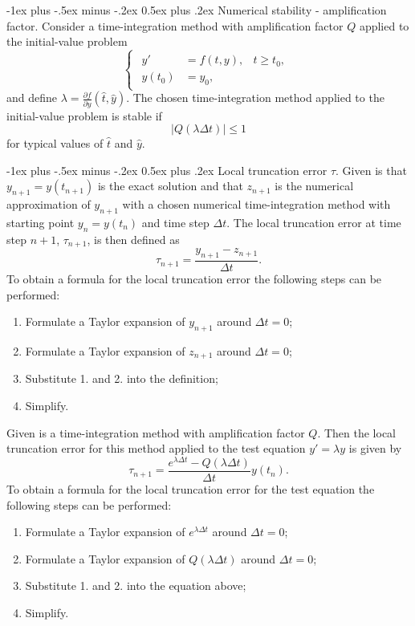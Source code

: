 \documentclass[10pt,landscape,a4paper]{article}
\makeatletter
\renewcommand{\section}{\@startsection{section}{1}{0mm}%
	{-1ex plus -.5ex minus -.2ex}%
	{0.5ex plus .2ex}%
	{\normalfont\large\bfseries}}
\makeatother
\begin{document}
\begin{multicols}{3}
	\section{Numerical stability - amplification factor.}
	Consider a time-integration method with amplification factor $ Q $ applied to the initial-value problem
	\[
		\begin{cases}
			\begin{aligned}
				y' & =f(t,y), & t\geq t_0, \\ y(t_0)&=y_0,&
			\end{aligned}
		\end{cases}
	\]
	and define $ \lambda = \frac{\partial f}{\partial y}(\hat{t},\hat{y}) $. The chosen time-integration method applied to the initial-value problem is stable if
	\[
		|Q(\lambda\Delta t)| \leq 1
	\]
	for typical values of $ \hat{t} $ and $ \hat{y} $.
	
	\section{Local truncation error $ \tau $.}
	Given is that $ y_{n+1}=y(t_{n+1}) $ is the exact solution and that $ z_{n+1} $ is the numerical approximation of $ y_{n+1} $ with a chosen numerical time-integration method with starting point $ y_n=y(t_n) $ and time step $ \Delta t $. The local truncation error at time step $ n+1 $, $ \tau_{n+1} $, is then defined as
	\[
		\tau_{n+1}=\frac{y_{n+1}-z_{n+1}}{\Delta t}.
	\]
	To obtain a formula for the local truncation error the following steps can be performed:
	\begin{enumerate}
		\item Formulate a Taylor expansion of $ y_{n+1} $ around $ \Delta t=0 $;
		\item Formulate a Taylor expansion of $ z_{n+1} $ around $ \Delta t=0 $;
		\item Substitute 1. and 2. into the definition;
		\item Simplify.
	\end{enumerate}
	Given is a time-integration method with amplification factor $ Q $. Then the local truncation error for this method applied to the test equation $ y'=\lambda y $ is given by
	\[
		\tau_{n+1}=\frac{e^{\lambda\Delta t}-Q(\lambda\Delta t)}{\Delta t}y(t_n).
	\]
	To obtain a formula for the local truncation error for the test equation the following steps can be performed:
	\begin{enumerate}
		\item Formulate a Taylor expansion of $ e^{\lambda\Delta t} $ around $ \Delta t=0 $;
		\item Formulate a Taylor expansion of $ Q(\lambda\Delta t) $ around $ \Delta t=0 $;
		\item Substitute 1. and 2. into the equation above;
		\item Simplify.
	\end{enumerate}
	

\end{multicols}
\end{document}
